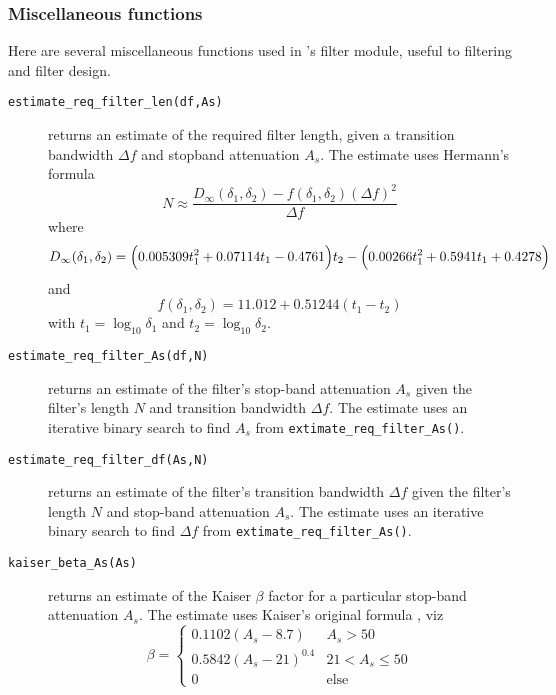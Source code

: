 \subsubsection{Miscellaneous functions}
\label{module:filter:misc}
Here are several miscellaneous functions used in \liquid's filter module,
useful to filtering and filter design.

\begin{description}
\item[{\tt estimate\_req\_filter\_len(df,As)}]
    returns an estimate of the required filter length, given a transition
    bandwidth $\Delta f$ and stopband attenuation $A_s$.
    The estimate uses Hermann's formula \cite{Herrmann:1973}
    \begin{equation}
    \label{eqn:filter:firdes:misc:estimate_N}
        N \approx \frac{
                D_{\infty}(\delta_1,\delta_2) - f(\delta_1,\delta_2)(\Delta f)^2
            }{
                \Delta f
            }
    \end{equation}
    where
    \[
        D_{\infty} (\delta_1,\delta_2) =
            \Bigl(0.005309 t_1^2 + 0.07114 t_1 - 0.4761 \Bigr) t_2
           -\Bigl(0.00266  t_1^2 + 0.5941  t_1 + 0.4278 \Bigr)
    \]
    and
    \[
        f(\delta_1,\delta_2) = 11.012 + 0.51244\left(t_1 - t_2\right)
    \]
    with $t_1 = \log_{10}\delta_1$ and $t_2 = \log_{10}\delta_2$.

\item[{\tt estimate\_req\_filter\_As(df,N)}]
    returns an estimate of the filter's stop-band attenuation $A_s$
    given the filter's length $N$ and transition bandwidth $\Delta f$.
    The estimate uses an iterative binary search to find $A_s$ from
    {\tt extimate\_req\_filter\_As()}.

\item[{\tt estimate\_req\_filter\_df(As,N)}]
    returns an estimate of the filter's transition bandwidth $\Delta f$
    given the filter's length $N$ and stop-band attenuation $A_s$.
    The estimate uses an iterative binary search to find $\Delta f$ from
    {\tt extimate\_req\_filter\_As()}.

\item[{\tt kaiser\_beta\_As(As)}]
    returns an estimate of the Kaiser $\beta$ factor for a particular
    stop-band attenuation $A_s$.
    The estimate uses Kaiser's original formula \cite{Vaidyanathan:1993}, viz
    \begin{equation}
    \label{eqn:filter:firdes:misc:kaiser_beta}
        \beta =
        \begin{cases}
            0.1102 (A_s - 8.7)      &   A_s > 50 \\
            0.5842 (A_s - 21)^{0.4} &   21 < A_s \le 50 \\
            0                       &   \text{else}
        \end{cases}
    \end{equation}


\end{description}
